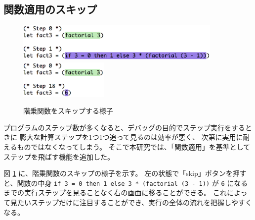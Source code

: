 \subsection{関数適用のスキップ}
\label{subsection:stepper__skip}

\begin{figure}
  \includegraphics[width=10cm]{6/beforeskip.eps}
  \includegraphics[width=4.3cm]{6/afterskip.eps}
  \caption{階乗関数をスキップする様子}
  \label{figure:factskip}
\end{figure}

プログラムのステップ数が多くなると、デバッグの目的でステップ実行をするときに
膨大な計算ステップを1つ1つ追って見るのは効率が悪く、
次第に実用に耐えるものではなくなってしまう。
そこで本研究では、「関数適用」を基準としてステップを飛ばす機能を追加した。

図 \ref{figure:factskip} に、階乗関数のスキップの様子を示す。
左の状態で「skip」ボタンを押すと、関数の中身
\texttt{if 3 = 0 then 1 else 3 * (factorial (3 - 1))} が
\texttt{6} になるまでの実行ステップを見ることなく右の画面に移ることができる。
これによって見たいステップだけに注目することができ、実行の全体の流れを把握しやすくなる。

